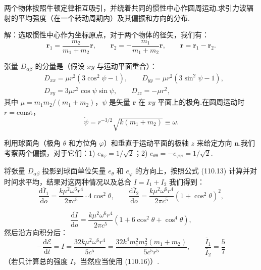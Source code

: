 \begin{xiti}

\quad 两个物体按照牛顿定律相互吸引，并绕着共同的惯性中心作圆周运动.求引力波辐射的平均强度（在一个转动周期内）及其偏振和方向的分布.

解：选取惯性中心作为坐标原点，对于两个物体的径矢，我们有：
\begin{equation*}
  \boldsymbol{r}_1=\frac{m_2}{m_1+m_2}\boldsymbol{r},
  \qquad
  \boldsymbol{r}_2=-\frac{m_1}{m_1+m_2}\boldsymbol{r},
  \qquad
  \boldsymbol{r}=\boldsymbol{r}_1-\boldsymbol{r}_2.
\end{equation*}

张量 $D_{\alpha\beta}$ 的分量是（假设 $xy$ 与运动平面重合）：
\begin{equation*}
\begin{aligned}
  &D_{xx}=\mu r^{2}(3\cos^{2}\psi-1),
  \qquad
  D_{yy}=\mu r^{2}(3\sin^{2}\psi-1),\\
  &D_{xy}=3\mu r^{2}\cos\psi\sin\psi,
  \qquad
  D_{zz}=-\mu r^{2},
\end{aligned}
\end{equation*}
其中 $\mu=m_1m_2/(m_1+m_2)$，$\psi$ 是矢量 $\boldsymbol{r}$ 在 $xy$ 平面上的极角.在圆周运动时 $r=\mathrm{const}$，
\begin{equation*}
  \dot{\psi}=r^{-3/2}\sqrt{k(m_1+m_2)}\equiv\omega.
\end{equation*}

利用球面角（极角 $\theta$ 和方位角 $\varphi$）和垂直于运动平面的极轴 $z$ 来给定方向 $\boldsymbol{n}$.我们考察两个偏振，对于它们：1) $e_{\theta\varphi}=1/\sqrt{2}$；2) $e_{\theta\theta}=-e_{\varphi\varphi}=1/\sqrt{2}$.

将张量 $D_{\alpha\beta}$ 投影到球面单位矢量 $e_\theta$ 和 $e_\varphi$ 的方向上，按照公式 (110.13) 计算并对时间求平均，结果对这两种情况以及总合 $I=I_1+I_2$ 我们得到：
\begin{equation*}
  \frac{\overline{\mathrm{d}I_1}}{\mathrm{d}o}
  =\frac{k\mu^{2}\omega^{6}r^{4}}{2\pi c^{5}}\cdot4\cos^{2}\theta,
  \qquad
  \frac{\overline{\mathrm{d}I_2}}{\mathrm{d}o}
  =\frac{k\mu^{2}\omega^{6}r^{4}}{2\pi c^{5}}(1+\cos^{2}\theta)^{2},
\end{equation*}

\begin{equation*}
  \frac{\overline{\mathrm{d}I}}{\mathrm{d}o}
  =\frac{k\mu^{2}\omega^{6}r^{4}}{2\pi c^{5}}
  (1+6\cos^{2}\theta+\cos^{4}\theta),
\end{equation*}
然后沿方向积分后：
\begin{equation*}
  -\frac{\mathrm{d}\mathcal{E}}{\mathrm{d}t}
  =I=\frac{32k\mu^{2}\omega^{6}r^{4}}{5c^{5}}
  =\frac{32k^{4}m_1^{2}m_2^{2}(m_1+m_2)}{5c^{5}r^{5}},
  \qquad
  \frac{\overline{I}_1}{\overline{I}_2}=\frac{5}{7}
\end{equation*}
（若只计算总的强度 $I$，当然应当使用 (110.16)）.


\end{xiti}
